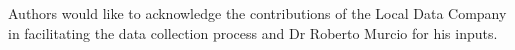 Authors would like to acknowledge the contributions of the Local Data Company in facilitating the data collection process and Dr Roberto Murcio for his inputs.

